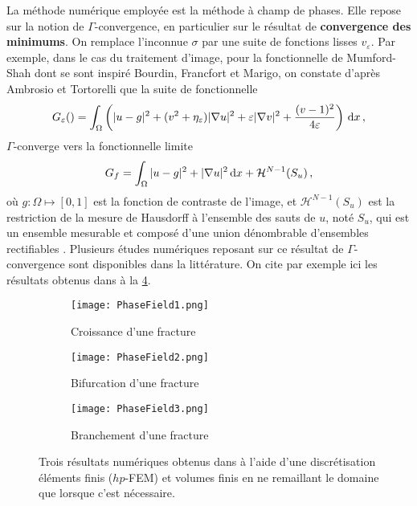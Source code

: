 La méthode numérique employée est la méthode à champ de phases. Elle repose sur la notion de $\Gamma$-convergence, en particulier sur le résultat de \textbf{convergence des minimums}. On remplace l'inconnue $\sigma$ par une suite de fonctions lisses $v_\varepsilon$. Par exemple, dans le cas du traitement d'image, pour la fonctionnelle de Mumford-Shah dont se sont inspiré Bourdin, Francfort et Marigo, on constate d'après Ambrosio et Tortorelli \parencite{ambrosio1990approximation} que la suite de fonctionnelle
$$
G_{\varepsilon}() = \int_{\Omega} \left( \vert u-g \vert^2 + (v^2 + \eta_{\varepsilon}) \vert \nabla u \vert^2 + \varepsilon \vert \nabla v \vert^2 + \frac{(v-1)^2}{4\varepsilon} \right) \diff x \,,
$$
$\Gamma$-converge vers la fonctionnelle limite 
$$
G_f = \int_{\Omega} \vert u-g \vert^2 + \vert \nabla u \vert^2 \diff x + \mathcal{H}^{N-1}(S_u) \,,
$$
où $g:\Omega \mapsto [0,1]$ est la fonction de contraste de l’image, et $\mathcal{H}^{N-1}(S_u)$ est la restriction de la mesure de Hausdorff à l’ensemble des sauts de $u$, noté $S_u$, qui est un ensemble mesurable et composé d’une union dénombrable d’ensembles rectifiables \parencite[pp.35-37]{balasoiu2020halthesis}. Plusieurs études numériques reposant sur ce résultat de $\Gamma$-convergence sont disponibles dans la littérature. On cite par exemple ici les résultats obtenus dans \parencite{nagaraja2019phase} à la \cref{fig:PhaseField}.

\begin{figure}[!ht]
    \centering
    \begin{subfigure}[b]{0.9\textwidth}
        \centering
        \texttt{[image: PhaseField1.png]} 
        \caption{Croissance d’une fracture}
        \label{fig:PhaseField1}
    \end{subfigure}
    \begin{subfigure}[b]{0.9\textwidth}
        \centering
        \texttt{[image: PhaseField2.png]} 
        \caption{Bifurcation d’une fracture}
        \label{fig:PhaseField2}
    \end{subfigure}
    \begin{subfigure}[b]{0.9\textwidth}
        \centering
        \texttt{[image: PhaseField3.png]} 
        \caption{Branchement d’une fracture}
        \label{fig:PhaseField3}
    \end{subfigure}
       \caption{Trois résultats numériques obtenus dans \parencite{nagaraja2019phase} à l'aide d'une discrétisation éléments finis ($hp$-FEM) et volumes finis en ne remaillant le domaine que lorsque c'est nécessaire.}
       \label{fig:PhaseField}
\end{figure}


